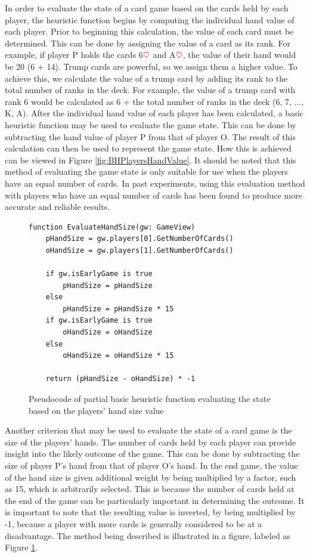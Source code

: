 In order to evaluate the state of a card game based on the cards held by each player, the heuristic function begins by computing the individual hand value of each player. Prior to beginning this calculation, the value of each card must be determined. This can be done by assigning the value of a card as its rank. For example, if player P holds the cards 6$\textcolor{red}{\heartsuit}$ and A$\textcolor{red}{\heartsuit}$, the value of their hand would be 20 (6 + 14). Trump cards are powerful, so we assign them a higher value. To achieve this, we calculate the value of a trump card by adding its rank to the total number of ranks in the deck. For example, the value of a trump card with rank 6 would be calculated as 6 + the total number of ranks in the deck (6, 7, ..., K, A). After the individual hand value of each player has been calculated, a basic heuristic function may be used to evaluate the game state. This can be done by subtracting the hand value of player P from that of player O. The result of this calculation can then be used to represent the game state. How this is achieved can be viewed in Figure \ref{fig:BHPlayersHandValue}. It should be noted that this method of evaluating the game state is only suitable for use when the players have an equal number of cards. In past experiments, using this evaluation method with players who have an equal number of cards has been found to produce more accurate and reliable results.

\begin{figure}[h]
\captionsetup{justification=centering}
\begin{lstlisting}
function EvaluateHandSize(gw: GameView)
    pHandSize = gw.players[0].GetNumberOfCards()
    oHandSize = gw.players[1].GetNumberOfCards()

    if gw.isEarlyGame is true
        pHandSize = pHandSize
    else
        pHandSize = pHandSize * 15
    if gw.isEarlyGame is true
        oHandSize = oHandSize
    else
        oHandSize = oHandSize * 15

    return (pHandSize - oHandSize) * -1
\end{lstlisting}
\caption{Pseudocode of partial basic heuristic function evaluating the state based on the players' hand size value}
\label{fig:BHPlayerHandSize}
\end{figure}

Another criterion that may be used to evaluate the state of a card game is the size of the players' hands. The number of cards held by each player can provide insight into the likely outcome of the game. This can be done by subtracting the size of player P's hand from that of player O's hand. In the end game, the value of the hand size is given additional weight by being multiplied by a factor, such as 15, which is arbitrarily selected. This is because the number of cards held at the end of the game can be particularly important in determining the outcome. It is important to note that the resulting value is inverted, by being multiplied by -1, because a player with more cards is generally considered to be at a disadvantage. The method being described is illustrated in a figure, labeled as Figure \ref{fig:BHPlayerHandSize}.

